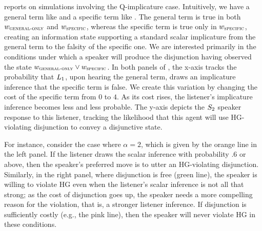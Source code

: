 \documentclass[12pt,twoside]{article}
\renewcommand{\_}{\textbf{\textunderscore\hspace{-4pt}\textunderscore\hspace{-3pt}\textunderscore\hspace{-4pt}\textunderscore}\hspace{0.5pt}}			%
\begin{document}
 reports on simulations involving the Q-implicature
case. Intuitively, we have a general term like  and a
specific term like . The general term is true in both
$w_\textsc{general-only}$ and $w_\textsc{specific}$, whereas the
specific term is true only in $w_\textsc{specific}$, creating an
information state supporting a standard scalar implicature from the
general term to the falsity of the specific one.  We are interested
primarily in the conditions under which a speaker will produce the
disjunction  having observed the state
$w_\textsc{general-only} \vee w_\textsc{specific}$. In both panels of
, the x-axis tracks the probability that
$\ListenerK[1]$, upon hearing the general term, draws an implicature
inference that the specific term is false. We create this variation by
changing the cost of the specific term from $0$ to $4$. As its cost
rises, the listener's implicature inference becomes less and less
probable. The y-axis depicts the $\SpeakerK[2]$ speaker response
to this listener, tracking the likelihood that this agent will use
HG-violating disjunction to convey a disjunctive state. 



For instance,
consider the case where $\alpha=2$, which is given by the orange line
in the left panel. If the listener draws the scalar inference with
probability $.6$ or above, then the speaker's preferred move is to
utter an HG-violating disjunction. Similarly, in the right panel,
where disjunction is free (green line), the speaker is willing to
violate HG even when the listener's scalar inference is not all that
strong; as the cost of disjunction goes up, the speaker needs a more
compelling reason for the violation, that is, a stronger listener
inference. If disjunction is sufficiently costly (e.g., the pink
line), then the speaker will never violate HG in these conditions.
\end{document}
